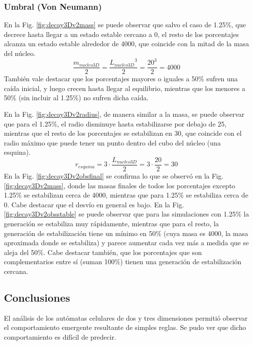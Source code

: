 \subsubsection{Umbral (Von Neumann)}
En la Fig. \ref{fig:decay3Dv2mass} se puede observar que salvo el caso de 1.25\%, que decrece hasta llegar a un estado estable cercano a 0, el resto de los porcentajes alcanza un estado estable alrededor de 4000, que coincide con la mitad de la masa del núcleo.
\begin{equation}
    \frac{m_{nucleo3D}}{2} = \frac{{L_{nucleo3D}}^3}{2} = \frac{20^3}{2} = 4000
\end{equation}
También vale destacar que los porcentajes mayores o iguales a 50\% sufren una caída inicial, y luego crecen hasta llegar al equilibrio, mientras que los menores a 50\% (sin incluir al 1.25\%) no sufren dicha caída.


En la Fig. \ref{fig:decay3Dv2radius}, de manera similar a la masa, se puede observar que para el 1.25\%, el radio disminuye hasta estabilizarse por debajo de 25, mientras que el resto de los porcentajes se estabilizan en 30, que coincide con el radio máximo que puede tener un punto dentro del cubo del núcleo (una esquina).
\begin{equation}
    r_{esquina} = 3 \cdot \frac{L_{nucleo3D}}{2} = 3 \cdot \frac{20}{2} = 30
\end{equation}
En la Fig. \ref{fig:decay3Dv2obsfinal} se confirma lo que se observó en la Fig. \ref{fig:decay3Dv2mass}, donde las masas finales de todos los porcentajes excepto 1.25\% se estabilizan cerca de 4000, mientras que para 1.25\% se estabiliza cerca de 0. Cabe destacar que el desvío en general es bajo.
En la Fig. \ref{fig:decay3Dv2obsstable} se puede observar que para las simulaciones con 1.25\% la generación se estabiliza muy rápidamente, mientras que para el resto, la generación de estabilización tiene un mínimo en 50\% (cuya masa es 4000, la masa aproximada donde se estabiliza) y parece aumentar cada vez más a medida que se aleja del 50\%. Cabe destacar también, que los porcentajes que son complementarios entre sí (suman 100\%) tienen una generación de estabilización cercana.

\subsection{Conclusiones}
\label{subsec:conclusiones}
El análisis de los autómatas celulares de dos y tres dimensiones permitió observar el comportamiento emergente resultante de simples reglas.
Se pudo ver que dicho comportamiento es difícil de predecir.

